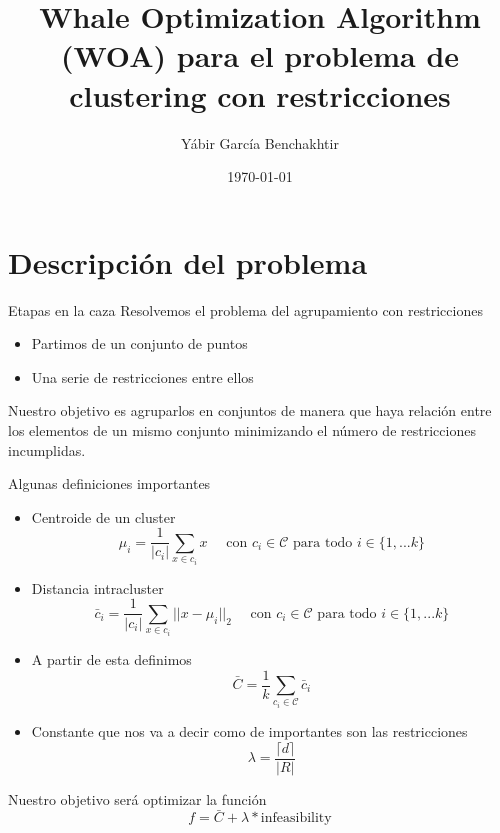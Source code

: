 \documentclass{beamer}
\title{Whale Optimization Algorithm (WOA) para el problema de clustering con restricciones}
\date{\today}
\author{Yábir García Benchakhtir}
\institute{Universidad de Granada}
\begin{document}
  \maketitle

\section{Descripción del problema}
\begin{frame}{Etapas en la caza}
    Resolvemos el problema del agrupamiento con restricciones

    \begin{itemize}
        \item Partimos de un conjunto de puntos
        \item Una serie de restricciones entre ellos
    \end{itemize}
    \pause
    Nuestro objetivo es agruparlos en conjuntos de manera que haya relación
    entre los elementos de un mismo conjunto minimizando el número de
    restricciones incumplidas.

\end{frame}

\begin{frame}
    Algunas definiciones importantes

    \begin{itemize}
        \item Centroide de un cluster 
        \[
            \mu_i = \frac{1}{|c_i|}\sum_{x\in c_i}x \quad \text{ con } c_i \in \mathcal{C} \text{ para todo } i \in \{1,...k\}
        \]  
        \pause
        \item Distancia intracluster
        \[
        \bar c_i = \frac{1}{|c_i|}\sum_{x\in c_i}||x-\mu_i||_2 \quad \text{ con } c_i \in \mathcal{C} \text{ para todo } i \in \{1,...k\}
        \]
        \pause
        \item A partir de esta definimos 
        \[
            \bar C = \frac{1}{k}\sum_{c_i\in \mathcal{C}}\bar c_i
        \]
        \pause
        \item Constante que nos va a decir como de importantes son las restricciones 
        \[
        \lambda = \frac{\lceil d \rceil}{|R|}
        \]
    \end{itemize}
\end{frame}

\begin{frame}
    Nuestro objetivo será optimizar la función
    \[
    f = \bar C + \lambda * \text{infeasibility}
    \]
\end{frame}
\end{document}
